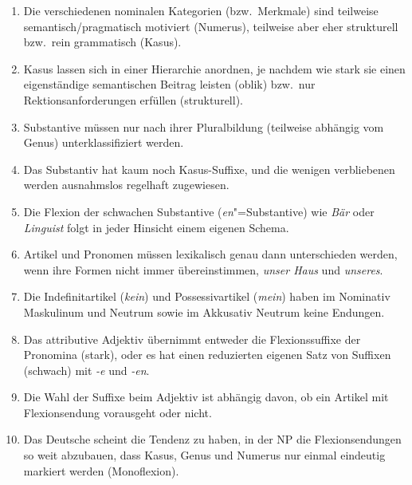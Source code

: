 \begin{enumerate}
  \item Die verschiedenen nominalen Kategorien (bzw.\ Merkmale) sind teilweise semantisch\slash pragmatisch motiviert (\zB Numerus), teilweise aber eher strukturell bzw.\ rein grammatisch (\zB Kasus).
  \item Kasus lassen sich in einer Hierarchie anordnen, je nachdem wie stark sie einen eigenständige semantischen Beitrag leisten (oblik) bzw.\ nur Rektionsanforderungen erfüllen (strukturell).
  \item Substantive müssen nur nach ihrer Pluralbildung (teilweise abhängig vom Genus) unterklassifiziert werden.
  \item Das Substantiv hat kaum noch Kasus-Suffixe, und die wenigen verbliebenen werden ausnahmslos regelhaft zugewiesen.
  \item Die Flexion der schwachen Substantive (\textit{en}"=Substantive) wie \textit{Bär} oder \textit{Linguist} folgt in jeder Hinsicht einem eigenen Schema.
  \item Artikel und Pronomen müssen lexikalisch genau dann unterschieden werden, wenn ihre Formen nicht immer übereinstimmen, \zB \textit{unser Haus} und \textit{unseres}.
  \item Die Indefinitartikel (\zB \textit{kein}) und Possessivartikel (\zB \textit{mein}) haben im Nominativ Maskulinum und Neutrum sowie im Akkusativ Neutrum keine Endungen.
  \item Das attributive Adjektiv übernimmt entweder die Flexionssuffixe der Pronomina (stark), oder es hat einen reduzierten eigenen Satz von Suffixen (schwach) mit \textit{-e} und \textit{-en}.
  \item Die Wahl der Suffixe beim Adjektiv ist abhängig davon, ob ein Artikel mit Flexionsendung vorausgeht oder nicht.
  \item Das Deutsche scheint die Tendenz zu haben, in der NP die Flexionsendungen so weit abzubauen, dass Kasus, Genus und Numerus nur einmal eindeutig markiert werden (Monoflexion).
\end{enumerate}

\Uebungen

